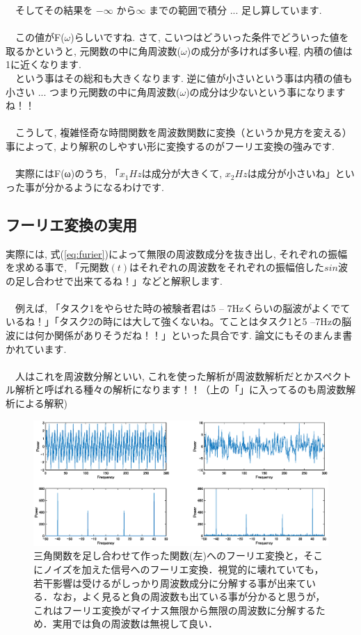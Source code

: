 \documentclass[11pt,a4paper]{ujreport} 	%
\begin{document}
　そしてその結果を $-\infty$ から$\infty$ までの範囲で積分 ... 足し算しています.\\\\
　この値がF($\omega$)らしいですね. さて, こいつはどういった条件でどういった値を取るかというと, 元関数の中に角周波数($\omega$)の成分が多ければ多い程, 内積の値は1に近くなります. \\
　という事はその総和も大きくなります. 逆に値が小さいという事は内積の値も小さい ... つまり元関数の中に角周波数($\omega$)の成分は少ないという事になりますね！！\\
\\
　こうして, 複雑怪奇な時間関数を周波数関数に変換（というか見方を変える）事によって, より解釈のしやすい形に変換するのがフーリエ変換の強みです.\\
\\
　実際にはF(ω)のうち, 「$x_1Hz$は成分が大きくて, $x_2Hz$は成分が小さいね」といった事が分かるようになるわけです.
\subsection{フーリエ変換の実用}
実際には, 式(\ref{eq:furier})によって無限の周波数成分を抜き出し, それぞれの振幅を求める事で, 「元関数$(t)$はそれぞれの周波数をそれぞれの振幅倍した$sin$波の足し合わせで出来てるね！」などと解釈します.\\\\
　例えば, 「タスク1をやらせた時の被験者君は5 -- 7Hzくらいの脳波がよくでているね！」「タスク2の時には大して強くないね。てことはタスク1と5 --7Hzの脳波には何か関係がありそうだね！！」といった具合です. 論文にもそのまんま書かれています.
\\\\
　人はこれを周波数分解といい, これを使った解析が周波数解析だとかスペクトル解析と呼ばれる種々の解析になります！！（上の「」に入ってるのも周波数解析による解釈)\\

\begin{figure}[H]
  \centering
  \includegraphics[width=15cm]{../figures/fourier.eps}
  \caption{三角関数を足し合わせて作った関数(左)へのフーリエ変換と，そこにノイズを加えた信号へのフーリエ変換．視覚的に壊れていても，若干影響は受けるがしっかり周波数成分に分解する事が出来ている．なお，よく見ると負の周波数も出ている事が分かると思うが，これはフーリエ変換がマイナス無限から無限の周波数に分解するため．実用では負の周波数は無視して良い．}
\end{figure}
\end{document}
